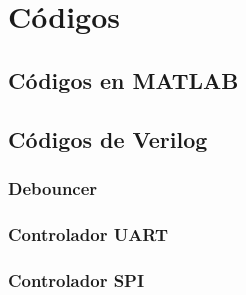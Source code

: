 \chapter{Códigos}

    \section{Códigos en MATLAB}
     
          

         

         
      \newpage	
	\section{Códigos de Verilog}

	  \subsection{Debouncer}
	  
	  
      
	  \subsection{Controlador UART}
	
    
    
    
    
    
    
    


    \newpage
	  \subsection{Controlador SPI}


